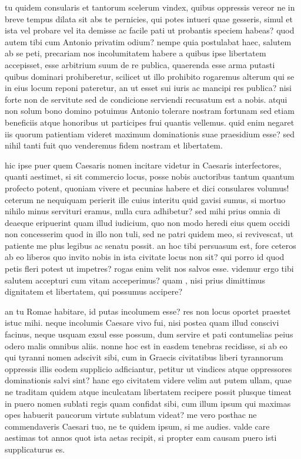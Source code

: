  tu quidem consularis et tantorum scelerum vindex, quibus oppressis vereor ne in breve tempus dilata sit abs te pernicies, qui potes intueri quae gesseris, simul et ista vel probare vel ita demisse ac facile pati ut probantis speciem habeas? quod autem tibi cum Antonio privatim odium? nempe quia postulabat haec, salutem ab se peti, precariam nos incolumitatem habere a quibus ipse libertatem accepisset, esse arbitrium suum de re publica, quaerenda esse arma putasti quibus dominari prohiberetur, scilicet ut illo prohibito rogaremus alterum qui se in eius locum reponi pateretur, an ut esset sui iuris ac mancipi res publica? nisi forte non de servitute sed de condicione serviendi recusatum est a nobis. atqui non solum bono domino potuimus Antonio tolerare nostram fortunam sed etiam beneficiis atque honoribus ut participes frui quantis vellemus. quid enim negaret iis quorum patientiam videret maximum dominationis suae praesidium esse? sed nihil tanti fuit quo venderemus fidem nostram et libertatem.

 hic ipse puer quem Caesaris nomen incitare videtur in Caesaris interfectores, quanti aestimet, si sit commercio locus, posse nobis auctoribus tantum quantum profecto potent, quoniam vivere et pecunias habere et dici consulares volumus! ceterum ne nequiquam perierit ille cuius interitu quid gavisi sumus, si mortuo nihilo minus servituri eramus, nulla cura adhibetur? sed mihi prius omnia di deaeque eripuerint quam illud iudicium, quo non modo heredi eius quem occidi non concesserim quod in illo non tuli, sed ne patri quidem meo, si revivescat, ut patiente me plus legibus ac senatu possit. an hoc tibi persuasum est, fore ceteros ab eo liberos quo invito nobis in ista civitate locus non sit? qui porro id quod petis fleri potest ut impetres? rogas enim velit nos salvos esse. videmur ergo tibi salutem accepturi cum vitam acceperimus? quam , nisi prius dimittimus dignitatem et libertatem, qui possumus accipere?

 an tu Romae habitare, id putas incolumem esse? res non locus oportet praestet istuc mihi. neque incolumis Caesare vivo fui, nisi postea quam illud conscivi facinus, neque usquam exsul esse possum, dum servire et pati contumelias peius odero malis omnibus aliis. nonne hoc est in easdem tenebras recidisse, si ab eo qui tyranni nomen adscivit sibi, cum in Graecis civitatibus liberi tyrannorum oppressis illis eodem supplicio adficiantur, petitur ut vindices atque oppressores dominationis salvi sint? hanc ego civitatem videre velim aut putem ullam, quae ne traditam quidem atque inculcatam libertatem recipere possit plusque timeat in puero nomen sublati regis quam confidat sibi, cum illum ipsum qui maximas opes habuerit paucorum virtute sublatum videat? me vero posthac ne commendaveris Caesari tuo, ne te quidem ipsum, si me audies. valde care aestimas tot annos quot ista aetas recipit, si propter eam causam puero isti supplicaturus es.


